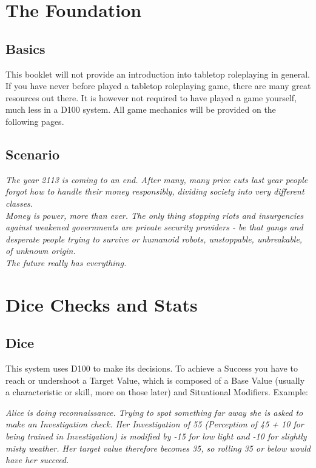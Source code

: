 \documentclass[12pt,a4paper,openany]{book}
\begin{document}
	

	\chapter{The Foundation}
	\section{Basics}
	This booklet will not provide an introduction into tabletop roleplaying in general. If you have never before played a tabletop roleplaying game, there are many great resources out there. It is however not required to have played a game yourself, much less in a D100 system. All game mechanics will be provided on the following pages.
	\section{Scenario}
	\begin{exampleblock}\textit{
		The year 2113 is coming to an end. After many, many price cuts last year people forgot how to handle their money responsibly, dividing society into \emph{very} different classes. \\
		Money is power, more than ever. The only thing stopping riots and insurgencies against weakened governments are private security providers - be that gangs and desperate people trying to survive or humanoid robots, unstoppable, unbreakable, of unknown origin. \\
		The future really has everything.
	}\end{exampleblock}

	\chapter{Dice Checks and Stats}
	\section{Dice}
	This system uses D100 to make its decisions. To achieve a Success you have to reach or undershoot a Target Value, which is composed of a Base Value (usually a characteristic or skill, more on those later) and Situational Modifiers. Example:

	\begin{exampleblock}
		\textit{Alice is doing reconnaissance. Trying to spot something far away she is asked to make an Investigation check. Her Investigation of 55 (Perception of 45 + 10 for being trained in Investigation) is modified by -15 for low light and -10 for slightly misty weather. Her target value therefore becomes 35, so rolling 35 or below would have her succeed.}
	\end{exampleblock}
\end{document}
